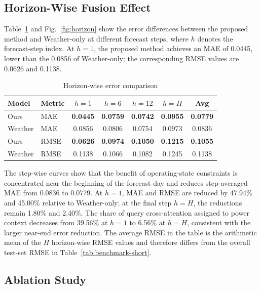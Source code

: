 \subsection{Horizon-Wise Fusion Effect}

Table~\ref{tab:horizon-short} and Fig.~\ref{fig:horizon} show the error differences between the proposed method and Weather-only at different forecast steps, where \(h\) denotes the forecast-step index. At \(h=1\), the proposed method achieves an MAE of 0.0445, lower than the 0.0856 of Weather-only; the corresponding RMSE values are 0.0626 and 0.1138.

\begin{table}[htbp]
\caption{Horizon-wise error comparison}
\begin{center}
\footnotesize
\begin{tabular}{llccccc}
\hline
Model & Metric & \(h=1\) & \(h=6\) & \(h=12\) & \(h=H\) & Avg \\
\hline
Ours & MAE & \textbf{0.0445} & \textbf{0.0759} & \textbf{0.0742} & \textbf{0.0955} & \textbf{0.0779} \\
Weather & MAE & 0.0856 & 0.0806 & 0.0754 & 0.0973 & 0.0836 \\
Ours & RMSE & \textbf{0.0626} & \textbf{0.0974} & \textbf{0.1050} & \textbf{0.1215} & \textbf{0.1055} \\
Weather & RMSE & 0.1138 & 0.1066 & 0.1082 & 0.1245 & 0.1138 \\
\hline
\end{tabular}
\label{tab:horizon-short}
\end{center}
\end{table}

The step-wise curves show that the benefit of operating-state constraints is concentrated near the beginning of the forecast day and reduces step-averaged MAE from 0.0836 to 0.0779. At \(h=1\), MAE and RMSE are reduced by 47.94\% and 45.00\% relative to Weather-only; at the final step \(h=H\), the reductions remain 1.80\% and 2.40\%. The share of query cross-attention assigned to power context decreases from 39.56\% at \(h=1\) to 6.56\% at \(h=H\), consistent with the larger near-end error reduction. The average RMSE in the table is the arithmetic mean of the \(H\) horizon-wise RMSE values and therefore differs from the overall test-set RMSE in Table~\ref{tab:benchmark-short}.

\subsection{Ablation Study}

